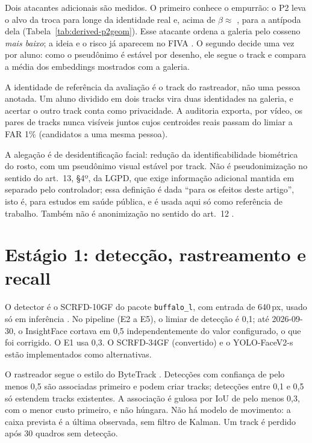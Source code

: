 Dois atacantes adicionais são medidos. O primeiro conhece o empurrão: o P2 leva o alvo da troca para longe da identidade real e, acima de $\beta \approx$ , para a antípoda dela (Tabela~\ref{tab:derived-p2geom}). Esse atacante ordena a galeria pelo cosseno \emph{mais baixo}; a ideia e o risco já aparecem no FIVA \citep{fiva}. O segundo decide uma vez por aluno: como o pseudônimo é estável por desenho, ele segue o track e compara a média dos embeddings mostrados com a galeria.

A identidade de referência da avaliação é o track do rastreador, não uma pessoa anotada. Um aluno dividido em dois tracks vira duas identidades na galeria, e acertar o outro track conta como privacidade. A auditoria exporta, por vídeo, os pares de tracks nunca visíveis juntos cujos centroides reais passam do limiar a FAR 1\% (candidatos a uma mesma pessoa).

A alegação é de desidentificação facial: redução da identificabilidade biométrica do rosto, com um pseudônimo visual estável por track. Não é pseudonimização no sentido do art.~13, §4º, da LGPD, que exige informação adicional mantida em separado pelo controlador; essa definição é dada ``para os efeitos deste artigo'', isto é, para estudos em saúde pública, e é usada aqui só como referência de trabalho. Também não é anonimização no sentido do art.~12 \citep{lgpd}.

\section{Estágio 1: detecção, rastreamento e recall}

O detector é o SCRFD-10GF do pacote \texttt{buffalo\_l}, com entrada de 640\,px, usado só em inferência \citep{scrfd,insightface}. No pipeline (E2 a E5), o limiar de detecção é 0,1; até 2026-09-30, o InsightFace cortava em 0,5 independentemente do valor configurado, o que foi corrigido. O E1 usa 0,3. O SCRFD-34GF (convertido) e o YOLO-FaceV2-s \citep{yolofacev2} estão implementados como alternativas.

O rastreador segue o estilo do ByteTrack \citep{bytetrack}. Detecções com confiança de pelo menos 0,5 são associadas primeiro e podem criar tracks; detecções entre 0,1 e 0,5 só estendem tracks existentes. A associação é gulosa por IoU de pelo menos 0,3, com o menor custo primeiro, e não húngara. Não há modelo de movimento: a caixa prevista é a última observada, sem filtro de Kalman. Um track é perdido após 30 quadros sem detecção.

